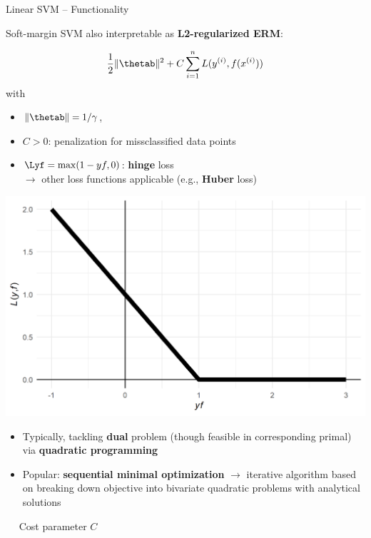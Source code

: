 \begin{vbframe}{Linear SVM -- Functionality}
\framebreak


Soft-margin SVM also interpretable as \textbf{L2-regularized ERM}: 

\begin{minipage}[b]{0.58\textwidth}
  $$ \frac{1}{2} \|\thetab\|^2 + C \sumin \Lxyi$$ 
  with  
  \begin{itemize}
    \item $\|\thetab\| = 1 / \gamma$,\\
    \item $C > 0$: penalization for missclassified data points
    \item $\Lyf = \max(1-yf, 0)$: \textbf{hinge} loss \\
    $\rightarrow$ other loss functions applicable (e.g., \textbf{Huber} loss)
  \end{itemize}
\end{minipage}
\begin{minipage}[b]{0.4\textwidth}
  \centering
  \includegraphics[height=0.4\textwidth, keepaspectratio=true]{
  figure/plot-hinge-loss.png}
\end{minipage}

\medskip


\begin{itemize}
  \item Typically, tackling \textbf{dual} problem (though feasible 
  in corresponding primal) via \textbf{quadratic programming}
  \item Popular: \textbf{sequential minimal optimization} $\rightarrow$ 
  iterative algorithm based on breaking down objective into bivariate quadratic 
  problems with analytical solutions
\end{itemize}
\medskip

 ~~ Cost parameter \textbf{$C$}

\end{vbframe}

